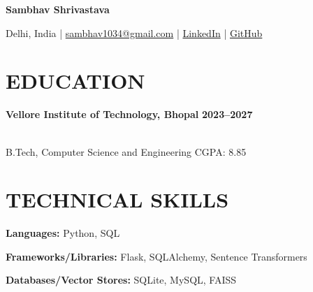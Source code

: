 \documentclass[10pt,a4paper]{article}
\begin{document}

\begin{center}

{\Large\bfseries Sambhav Shrivastava}

\vspace{2pt}

Delhi, India \;|\;
\href{mailto:sambhav1034@gmail.com}{sambhav1034@gmail.com}
\;|\;
\href{https://www.linkedin.com/in/sambhav-shrivastava-079a17289}{LinkedIn}
\;|\;
\href{https://github.com/samSh10}{GitHub}

\end{center}

\vspace{-8pt}


\section*{EDUCATION}

\textbf{Vellore Institute of Technology, Bhopal}
\hfill
\textbf{2023--2027}

\\[-2pt]

B.Tech, Computer Science and Engineering
\hfill
CGPA: 8.85

\vspace{4pt}


\section*{TECHNICAL SKILLS}

\textbf{Languages:} Python, SQL

\vspace{2pt}

\textbf{Frameworks/Libraries:} Flask, SQLAlchemy, Sentence Transformers

\vspace{2pt}

\textbf{Databases/Vector Stores:} SQLite, MySQL, FAISS

\vspace{2pt}
\end{document}
